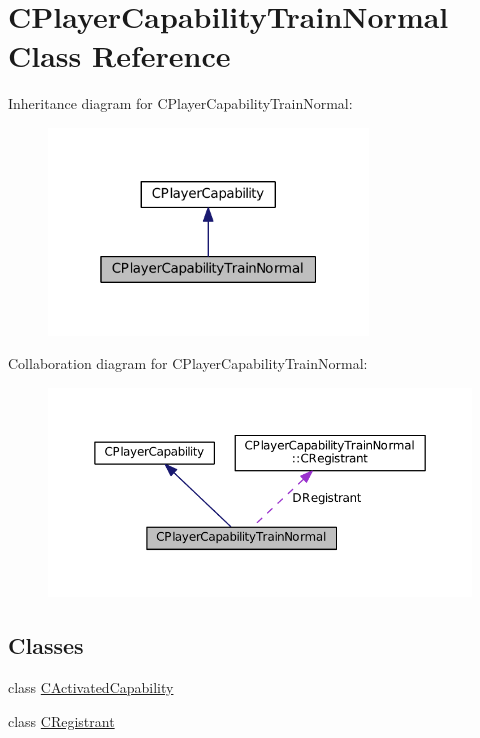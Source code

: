 \hypertarget{classCPlayerCapabilityTrainNormal}{}\section{C\+Player\+Capability\+Train\+Normal Class Reference}
\label{classCPlayerCapabilityTrainNormal}


Inheritance diagram for C\+Player\+Capability\+Train\+Normal\+:
\nopagebreak
\begin{figure}[H]
\begin{center}
\leavevmode
\includegraphics[width=241pt]{classCPlayerCapabilityTrainNormal__inherit__graph}
\end{center}
\end{figure}


Collaboration diagram for C\+Player\+Capability\+Train\+Normal\+:
\nopagebreak
\begin{figure}[H]
\begin{center}
\leavevmode
\includegraphics[width=350pt]{classCPlayerCapabilityTrainNormal__coll__graph}
\end{center}
\end{figure}
\subsection*{Classes}
\begin{DoxyCompactItemize}
\item 
class \hyperlink{classCPlayerCapabilityTrainNormal_1_1CActivatedCapability}{C\+Activated\+Capability}
\item 
class \hyperlink{classCPlayerCapabilityTrainNormal_1_1CRegistrant}{C\+Registrant}
\end{DoxyCompactItemize}
